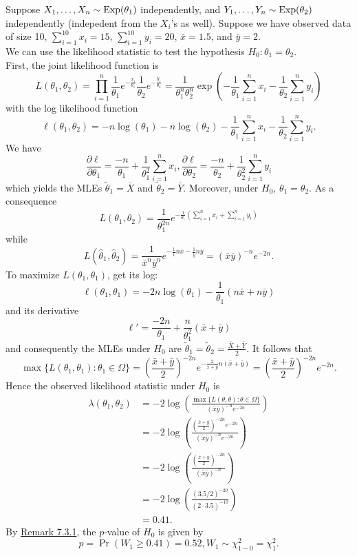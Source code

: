 \documentclass[11pt,fleqn]{book} %
\begin{document}
\begin{example} \label{eg:732}
Suppose \(X_1, \ldots, X_n \sim \operatorname{Exp}(\theta_1)\) independently, and \(Y_1, \ldots, Y_n \sim \operatorname{Exp}(\theta_2)\) independently (indepedent from the \(X_i\)'s as well). Suppose we have observed data of size 10, \(\sum_{i=1}^{10}x_i = 15\), \(\sum_{i=1}^{10}y_i = 20\), \(\bar{x} = 1.5\), and \(\bar{y} = 2\).  \\
\indent We can use the likelihood statistic to test the hypothesis \(H_0: \theta_1 = \theta_2\). \\
\indent First, the joint likelihood function is
\[
L(\theta_1, \theta_2) = \prod_{i=1}^n \frac{1}{\theta_1} e^{-\frac{x_i}{\theta_1}}\frac{1}{\theta_2}e^{-\frac{y_i}{\theta_2}} = \frac{1}{\theta_1^n\theta_2^n} \exp\left(-\frac{1}{\theta_1}\sum_{i=1}^nx_i - \frac{1}{\theta_2}\sum_{i=1}^ny_i\right)
\]
with the log likelihood function
\[
\ell(\theta_1, \theta_2) = -n\log(\theta_1) - n\log(\theta_2) - \frac{1}{\theta_1}\sum_{i=1}^nx_i - \frac{1}{\theta_2}\sum_{i=1}^ny_i.
\]
\indent We have
\[
\frac{\partial\ell}{\partial\theta_1} = \frac{-n}{\theta_1} + \frac{1}{\theta_1^2}\sum_{i=1}^nx_i, \frac{\partial\ell}{\partial\theta_2} = \frac{-n}{\theta_2} + \frac{1}{\theta_2^2}\sum_{i=1}^ny_i
\]
which yields the MLEs \(\tilde{\theta}_1 = \bar{X}\) and \(\tilde{\theta}_2 = \bar{Y}\). Moreover, under \(H_0\), \(\theta_1 = \theta_2\). As a consequence
\[
L(\theta_1, \theta_2) = \frac{1}{\theta_1^{2n}}e^{-\frac{1}{\theta_1}\left(\sum_{i=1}^n x_i + \sum_{i=1}^n y_i\right)}
\]
while 
\[
L(\hat{\theta}_1, \hat{\theta}_2) = \frac{1}{\bar{x}^n\bar{y}^n}e^{-\frac{1}{\bar{x}}n\bar{x} - \frac{1}{\bar{y}}n\bar{y}} = (\bar{x}\bar{y})^{-n}e^{-2n}.
\]
\indent To maximize \(L(\theta_1, \theta_1)\), get its log:
\[
\ell(\theta_1, \theta_1) = -2n\log(\theta_1) - \frac{1}{\theta_1}(n\bar{x} + n\bar{y})
\]
and its derivative
\[
\ell' = \frac{-2n}{\theta_1} + \frac{n}{\theta_1^2}(\bar{x} + \bar{y})
\]
and consequently the MLEs under \(H_0\) are \(\tilde{\theta}_1 = \tilde{\theta}_2 = \frac{\bar{X} + \bar{Y}}{2}\). It follows that
\[
\max\{L(\theta_1, \theta_1): \theta_1 \in \Omega\} = \left(\frac{\bar{x} + \bar{y}}{2}\right)^{-2n}e^{-\frac{2}{\bar{x} + \bar{y}}n(\bar{x} + \bar{y})} = \left(\frac{\bar{x} + \bar{y}}{2}\right)^{-2n}e^{-2n}.
\]
\indent Hence the observed likelihood statistic under \(H_0\) is
\[
\begin{aligned}
\lambda(\theta_1, \theta_2) &= -2\log\left(\frac{\max\{L(\theta, \theta): \theta\in\Omega\}}{(\bar{x}\bar{y})^{-n}e^{-2n}}\right) \\
&= -2\log\left(\frac{\left(\frac{\bar{x} + \bar{y}}{2}\right)^{-2n}e^{-2n}}{(\bar{x}\bar{y})^{-n}e^{-2n}}\right) \\
&= -2\log\left(\frac{\left(\frac{\bar{x} + \bar{y}}{2}\right)^{-2n}}{(\bar{x}\bar{y})^{-n}}\right) \\
&= -2\log\left(\frac{(3.5/2)^{-20}}{(2\cdot3.5)^{-10}}\right) \\
&= 0.41.
\end{aligned}
\]
\indent By \hyperref[rmk:731]{Remark 7.3.1}, the \(p\)-value of \(H_0\) is given by
\[
p = \Pr(W_1 \geq 0.41) = 0.52, W_1 \sim \chi^2_{1-0} = \chi^2_1.
\]
\end{example}
\end{document}

